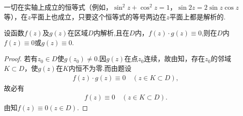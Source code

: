 \documentclass[../../main.tex]{subfiles}%
\begin{document}
\begin{corollary}
一切在实轴上成立的恒等式（例如，$\sin^2 z+\cos^2 z=1$，$\sin 2z=2\sin z\cos z$等），在$z$平面上也成立，只要这个恒等式的等号两边在$z$平面上都是解析的.
\end{corollary}

\begin{proposition}
设函数$f(z)$及$g(z)$在区域$D$内解析,且在$D$内，$f(z)\cdot g(z)\equiv0$,则在$D$内$f(z)\equiv0$或$g(z)\equiv0$.
\end{proposition}
\begin{proof}

若有$z_0\in D$使$g(z_0)\neq0$.因$g(z)$在点$z_0$连续，故由知，存在$z_0$的邻域$K\subset D$，使$g(z)$在$K$内恒不为零.而由题设
\begin{align*}
f(z)\cdot g(z)\equiv0\quad (z\in K\subset D),
\end{align*}
故必有
\begin{align*}
f(z)\equiv0\quad (z\in K\subset D).
\end{align*}
由知$f(z)\equiv0(z\in D)$.

\end{proof}
\end{document}
